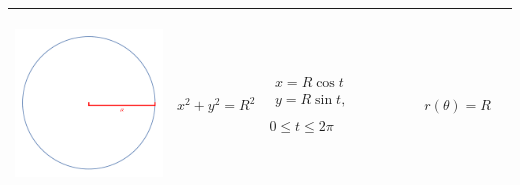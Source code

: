 \documentclass[12pt]{article}
\begin{document}
\begin{center}
\begin{tabular}{|C{2.75in}|C{1.625in}|C{1.625in}|C{1.625in}|N}
	\hline
	\includegraphics[trim={0 -4.5mm 0 -4.5mm}, clip, height=1.875in]{2_Circles}  &
	$x^2+y^2=R^2$ &
	$\begin{array}{c}
	x=R\cos{t}\\
	y=R\sin{t},\\[6mm]
	\end{array}$ $0\leq t\leq 2\pi$ \vspace{-10mm}& 
	$r(\theta)=R$ & \\
	
	\hline
	\end{tabular}
	\end{center}

	\newpage
	
\end{document}
